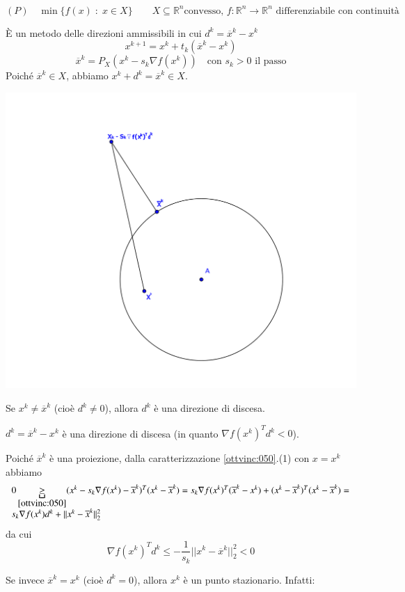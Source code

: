 $$ (P) \quad  \min \{ f(x) \; : \; x \in X \}
\qquad
X \subseteq \mathbb{R}^{n} \text{convesso, }
f:\mathbb{R}^{n} \rightarrow \mathbb{R}^{n}
\text{ differenziabile con continuit\`a}
$$

\`E un metodo delle direzioni ammissibili in cui
$d^{k} = \overline{x}^{k} - x^{k}$
$$ x^{k+1} = x^k + t_k (\overline{x}^k - x^k) $$
$$ \overline{x}^{k} = P_{X}(x^{k} - s_{k} \nabla f(x^{k})) \quad
\text{con } s_k > 0 \text{ il passo}$$
Poich\'e $\overline{x}^{k} \in X$, abbiamo
$x^{k} + d^{k} = \overline{x}^{k} \in X$.
\begin{center}
  \includegraphics[scale=0.6]{imgs/gradproiettato.png}
\end{center}
Se $x^{k} \neq \overline{x}^{k}$ (cio\`e $d^{k} \neq 0$), allora
$d^{k}$ \`e una direzione di discesa.

\begin{theo}
  $d^{k} = \overline{x}^{k} - x^k$ \`e una direzione di discesa
  (in quanto $\nabla f(x^{k})^{T}d^{k} < 0$).
\end{theo}

\begin{thproof}
Poich\'e $\overline{x}^{k}$ \`e una proiezione, dalla 
caratterizzazione \ref{ottvinc:050}.(1) con $x=x^{k}$ abbiamo
$$
\begin{array}{l}
0 \underbracket{\geq}_{\ref{ottvinc:050}} (x^{k} - s_k \nabla f({x}^{k}) -\overline{x}^{k})^{T}
(x^{k} - \overline{x}^{k}) = s_k \nabla f(x^{k})^{T}
(\overline{x}^{k}- x^{k}) + (x^{k} - \overline{x}^{k})^{T}
(x^{k} - \overline{x}^{k}) = \\
s_k \nabla f(x^{k}) d^{k} + 
|| x^{k} - \overline{x}^{k}||_{2}^{2}   
\end{array}
$$
da cui
$$\nabla f(x^{k})^{T} d^{k} \leq
- \dfrac{1}{s_k} ||x^{k} - \overline{x}^{k}||_{2}^{2} < 0
$$
\end{thproof}
Se invece $\overline{x}^{k} = x^{k}$ (cio\`e $d^{k} = 0$), allora
$x^{k}$ \`e un punto stazionario. Infatti:

